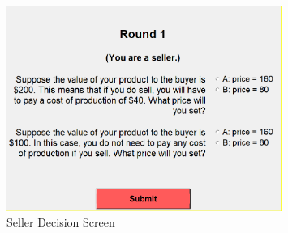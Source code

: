 
\begin{figure}[h]
    \centering
    \includegraphics[width=0.8\textwidth]{../output/zTree Images/seller decision.png}
    \caption{Seller Decision Screen}
    \label{seller_decision_screen}
\end{figure}
